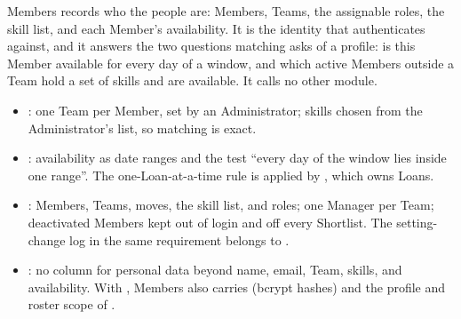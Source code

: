 

Members records who the people are: Members, Teams, the assignable roles, the skill list, and each Member's availability. It is the identity that  authenticates against, and it answers the two questions matching asks of a profile: is this Member available for every day of a window, and which active Members outside a Team hold a set of skills and are available. It calls no other module.

\begin{itemize}
\item {}: one Team per Member, set by an Administrator; skills chosen from the Administrator's list, so matching is exact.
\item {}: availability as date ranges and the test ``every day of the window lies inside one range''. The one-Loan-at-a-time rule is applied by , which owns Loans.
\item {}: Members, Teams, moves, the skill list, and roles; one Manager per Team; deactivated Members kept out of login and off every Shortlist. The setting-change log in the same requirement belongs to .
\item {}: no column for personal data beyond name, email, Team, skills, and availability. With , Members also carries  (bcrypt hashes) and the profile and roster scope of .
\end{itemize}

